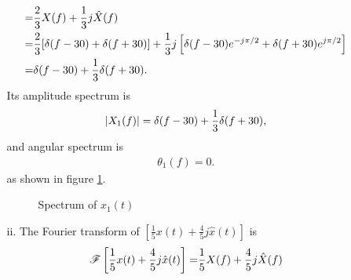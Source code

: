 \documentclass{assignment}
\begin{document}
\begin{sol}
\begin{itemize}
\begin{itemize}
\begin{align}
                \notag=&\frac{2}{3}X(f)+\frac{1}{3}j\hat{X}(f)\\
                \notag=&\frac{2}{3}[\delta(f-30)+\delta(f+30)]+\frac{1}{3}j\left[\delta(f-30)e^{-j\pi/2}+\delta(f+30)e^{j\pi/2}\right]\\
                =&\delta(f-30)+\frac{1}{3}\delta(f+30).
            \end{align}
            Its amplitude spectrum is
            \begin{align}
                \left\lvert X_1(f)\right\rvert=\delta(f-30)+\frac{1}{3}\delta(f+30),
            \end{align}
            and angular spectrum is
            \begin{align}
                \theta_1(f)=0.
            \end{align}
            as shown in figure \ref{7-X1}.
            \begin{figure}[h]
                \centering
                \caption{Spectrum of $x_1(t)$}
                \label{7-X1}
            \end{figure}
            \item[ii.] The Fourier transform of $\left[\frac{1}{5}x(t)+\frac{4}{5}j\hat{x}(t)\right]$ is
            \begin{align}
                \notag\mathscr{F}\left[\frac{1}{5}x(t)+\frac{4}{5}j\hat{x}(t)\right]=&\frac{1}{5}X(f)+\frac{4}{5}j\hat{X}(f)\\

\end{align}
\end{itemize}
\end{itemize}
\end{sol}
\end{document}
